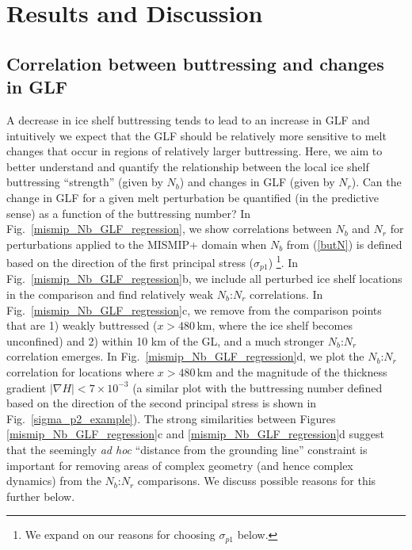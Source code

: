 \documentclass[review,oneside]{igs}
\begin{document}
\section{Results and Discussion}

\subsection{Correlation between buttressing and changes in GLF}

A decrease in ice shelf buttressing tends to lead to an increase in GLF \citep[e.g.,][]{gagliardini2010} and intuitively we expect that the GLF should be relatively more sensitive to melt changes that occur in regions of relatively larger buttressing. Here, we aim to better understand and quantify the relationship between the local ice shelf buttressing ``strength'' (given by $N_b$) and changes in GLF (given by $N_r$). Can the change in GLF for a given melt perturbation be quantified (in the predictive sense) as a function of the buttressing number? In Fig.~\ref{mismip_Nb_GLF_regression}, we show correlations between $N_b$ and $N_r$ for perturbations applied to the MISMIP+ domain when $N_b$ from (\ref{butN}) is defined based on the direction of the first principal stress ($\sigma_{p1}$) \footnote{We expand on our reasons for choosing $\sigma_{p1}$ below.}. In Fig.~\ref{mismip_Nb_GLF_regression}b, we include all perturbed ice shelf locations in the comparison and find relatively weak $N_b$:$N_r$ correlations. In Fig.~\ref{mismip_Nb_GLF_regression}c, we remove from the comparison points that are 1) weakly buttressed ($x>480$\,km, where the ice shelf becomes unconfined) and 2) within 10 km of the GL, and a much stronger $N_b$:$N_r$ correlation emerges. In Fig.~\ref{mismip_Nb_GLF_regression}d, we plot the $N_b$:$N_r$ correlation for locations where $x>480$\,km and the magnitude of the thickness gradient $\left|\nabla H\right|<7\times 10^{-3}$ (a similar plot with the buttressing number defined based on the direction of the second principal stress is shown in Fig.~\ref{sigma_p2_example}). The strong similarities between Figures \ref{mismip_Nb_GLF_regression}c and \ref{mismip_Nb_GLF_regression}d suggest that the seemingly \textit{ad hoc} ``distance from the grounding line'' constraint is important for removing areas of complex geometry (and hence complex dynamics) from the $N_b$:$N_r$ comparisons. We discuss possible reasons for this further below.
\end{document}

